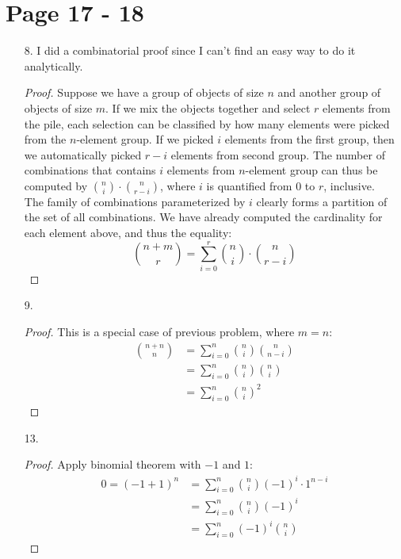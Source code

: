 \documentclass{article}
\begin{document}
\section*{Page 17 - 18}
\begin{itemize}
\item [8.]
  I did a combinatorial proof since I can't find an easy way to do it analytically.
  \begin{proof}
    Suppose we have a group of objects of size $n$ and another group of objects of size $m$. If we mix the objects together and select $r$ elements from the pile, each selection can be classified by how many elements were picked from the $n$-element group. If we picked $i$ elements from the first group, then we automatically picked $r-i$ elements from second group. The number of combinations that contains $i$ elements from $n$-element group can thus be computed by ${n \choose i} \cdot {n \choose r-i}$, where $i$ is quantified from $0$ to $r$, inclusive.\\
    
    The family of combinations parameterized by $i$ clearly forms a partition of the set of all combinations. We have already computed the cardinality for each element above, and thus the equality:
    \[{n+m \choose r}=\sum_{i=0}^{r}{n \choose i} \cdot {n \choose r-i}\]
  \end{proof}
\item [9.]
  \begin{proof}
This is a special case of previous problem, where $m=n$:
  \begin{equation*}
    \begin{split}
      {n+n \choose n} &= \sum_{i=0}^{n}{n \choose i} {n \choose n-i}\\
      &= \sum_{i=0}^{n}{n \choose i} {n \choose i}\\
      &= \sum_{i=0}^{n}{n \choose i}^{2}
    \end{split}
  \end{equation*}
\end{proof}

\item [13.]
  \begin{proof}
Apply binomial theorem with $-1$ and $1$:
  \begin{equation*}
    \begin{split}
      0 = (-1+1)^n &= \sum_{i=0}^{n}{n \choose i}(-1)^i\cdot 1 ^{n-i}\\
      &= \sum_{i=0}^{n}{n \choose i}(-1)^i\\
      &= \sum_{i=0}^{n}(-1)^i{n \choose i}
    \end{split}
  \end{equation*}
\end{proof}

\end{itemize}
\end{document}
